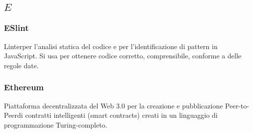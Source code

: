 \subsection*{\quad$E\quad$}

\subsubsection*{ESlint}
Linter\glo per l’analisi statica del codice e per l’identificazione di pattern in JavaScript. Si usa per ottenere codice corretto, comprensibile, conforme a delle regole date.

\subsubsection*{Ethereum}
Piattaforma decentralizzata del Web 3.0 per la creazione e pubblicazione Peer-to-Peer\glosp di contratti intelligenti (smart contracts\glo) creati in un linguaggio di programmazione Turing-completo.

